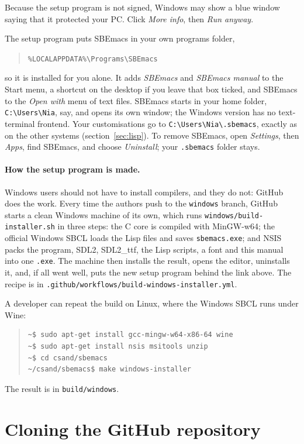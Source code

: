 \documentclass[a4paper,12pt,openany]{book}
\begin{document}
Because the setup program is not signed, Windows may show a blue
window saying that it protected your PC. Click {\em More info},
then {\em Run anyway}.

The setup program puts SBEmacs in your own programs folder,
\begin{quote}
\verb|%LOCALAPPDATA%\Programs\SBEmacs|
\end{quote}
so it is installed for you alone. It adds {\em SBEmacs} and {\em SBEmacs manual} to the
Start menu, a shortcut on the desktop if you leave that box ticked,
and SBEmacs to the {\em Open with} menu of text files. SBEmacs
starts in your home folder, \verb|C:\Users\Nia|, say, and opens its
own window; the Windows version has no text-terminal frontend. Your
customisations go to \verb|C:\Users\Nia\.sbemacs|, exactly as on the
other systems (section~\ref{sec:lisp}). To remove SBEmacs, open
{\em Settings}, then {\em Apps}, find SBEmacs, and choose
{\em Uninstall}; your \verb|.sbemacs| folder stays.

\paragraph{How the setup program is made.} Windows users should
not have to install compilers, and they do not: GitHub does the
work. Every time the authors push to the \verb|windows| branch,
GitHub starts a clean Windows machine of its own, which runs
\verb|windows/build-installer.sh| in three steps:
the C core is compiled with MinGW-w64; the official
Windows SBCL loads the Lisp files and saves
\verb|sbemacs.exe|; and NSIS packs the program, SDL2, SDL2\_ttf,
the Lisp scripts, a font and this manual into one \verb|.exe|.
The machine then installs the result, opens the editor, uninstalls
it, and, if all went well, puts the new setup program behind the
link above. The recipe is in
\verb|.github/workflows/build-windows-installer.yml|.

A developer can repeat the build on Linux, where the Windows SBCL
runs under Wine:
\begin{quote}
\begin{verbatim}
~$ sudo apt-get install gcc-mingw-w64-x86-64 wine
~$ sudo apt-get install nsis msitools unzip
~$ cd csand/sbemacs
~/csand/sbemacs$ make windows-installer
\end{verbatim}
\end{quote}
The result is in \verb|build/windows|.

\section{Cloning the GitHub repository}\label{sec:clone}
\end{document}

